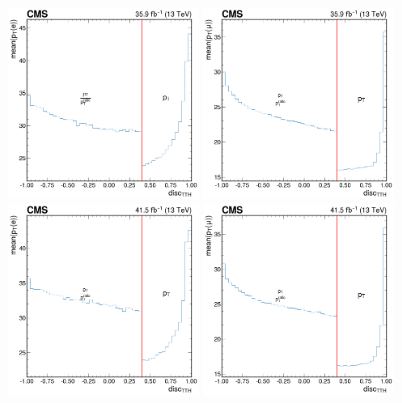 \begin{figure}
  \centering
  \includegraphics[width=0.45\textwidth]{cone_correction/uncorrected_Electron_0p4_2016.png} \hfill
  \includegraphics[width=0.45\textwidth]{cone_correction/uncorrected_Muon_0p4_2016.png} \\
  \includegraphics[width=0.45\textwidth]{cone_correction/uncorrected_Electron_0p4_2017.png} \hfill
  \includegraphics[width=0.45\textwidth]{cone_correction/uncorrected_Muon_0p4_2017.png} \\

\end{figure}
